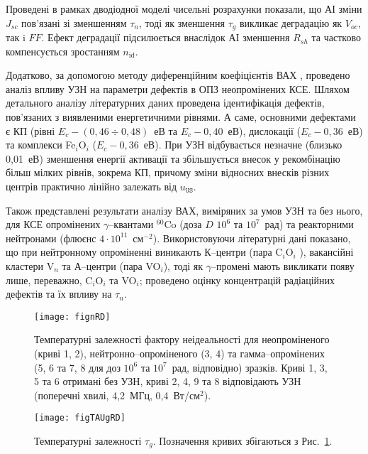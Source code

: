 \documentclass[a5paper,10pt,twoside,openany,article]{memoir} %
\begin{document}
Проведені в рамках дводіодної моделі чисельні розрахунки показали, що АІ зміни $J_{sc}$ пов'язані зі зменшенням $\tau_{n}$,
тоді як зменшення $\tau_{g}$ викликає деградацію як $V_{oc}$, так i $F\!F$.
Ефект деградації підсилюється внаслідок АI зменшення $R_{sh}$ та частково компенсується зростанням $n_\mathrm{id}$.

Додатково, за допомогою методу диференційним коефіцієнтів ВАХ \cite{Bulyar}, проведено аналіз впливу УЗН на параметри дефектів в ОПЗ неопромінених КСЕ.
Шляхом детального аналізу літературних даних проведена ідентифікація дефектів, пов'язаних з виявленими енергетичними рівнями.
А саме, основними дефектами є КП (рівні $E_c-(0,46\div0,48)$~еВ та $E_c-0,40$~еВ), дислокації ($E_c-0,36$~еВ) та комплекси Fe$_i$O$_i$ ($E_c-0,36$~еВ).
При УЗН відбувається незначне (близько 0,01~еВ) зменшення енергії активації та збільшується внесок
у рекомбінацію більш мілких рівнів, зокрема КП, причому зміни відносних внесків різних центрів практично лінійно залежать від $u_\mathtt{US}$.

Також представлені результати аналізу ВАХ, виміряних за умов УЗН та без нього, для КСЕ опромінених $\gamma$--квантами $^{60}$Co (доза $D$ $10^6$ та $10^7$~рад) та реакторними нейтронами (флюєнс $4\cdot10^{11}$~см$^{-2}$).
Використовуючи літературні дані показано, що при нейтронному опроміненні виникають К--центри (пара C$_i$O$_i$ ),
вакансійні кластери V$_n$ та А--центри (пара VO$_i$), тоді як $\gamma$--промені мають викликати появу лише, переважно, C$_i$O$_i$ та VO$_i$;
проведено оцінку концентрацій радіаційних дефектів та їх впливу на $\tau_n$.

\begin{figure}[ht]
\center
\texttt{[image: fignRD]}%
\caption{\label{fignRD}
Температурні залежності фактору неідеальності
для неопроміненого (криві 1, 2),
нейтронно--опроміненого (3, 4) та
гамма--опромінених (5, 6 та 7, 8 для доз $10^6$ та $10^7$~рад, відповідно)
зразків.
Криві 1, 3, 5 та 6 отримані без УЗН,
криві 2, 4, 9 та 8 відповідають УЗН (поперечні хвилі, 4,2~МГц, 0,4~Вт/см$^2$).
}%
\end{figure}


\begin{figure}[ht]
\center
\texttt{[image: figTAUgRD]}%
\caption{\label{figTAUgRD}
Температурні залежності $\tau_g$.
Позначення кривих збігаються з Рис.~\ref{fignRD}.
}%
\end{figure}
\end{document}
